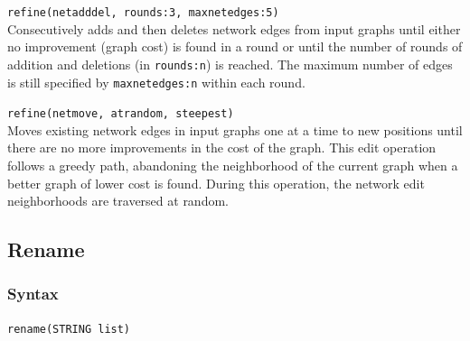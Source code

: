 	\begin{example}
		\item{\texttt{refine(netadddel, rounds:3, maxnetedges:5)}\\
		 Consecutively adds and then deletes network edges from input graphs until 
		 either no improvement (graph cost) is found in a round or until the number of 
		 rounds of addition and deletions (in \texttt{rounds:n}) is reached. The maximum 
		 number of edges is still specified by \texttt{maxnetedges:n} within each round.}
		
		\item{\texttt{refine(netmove, atrandom, steepest)} \\ Moves existing network 
		edges in input graphs one at a time to new positions until there are no more 
		improvements in the cost of the graph. This edit operation follows a greedy 
		path, abandoning the neighborhood of the current graph when a better graph
		of lower cost is found. During this operation, the network edit neighborhoods
		are traversed at random. }
	\end{example}
\subsection{Rename}
	\label{subsec:Rename}
	\subsubsection{Syntax}
		\texttt{rename(STRING list)}
		
